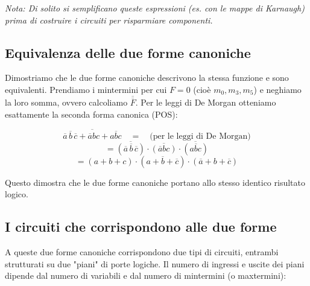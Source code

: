 \documentclass[11pt,a4paper]{report}
\begin{document}
\noindent \emph{Nota: Di solito si semplificano queste espressioni (es. con le mappe di Karnaugh) prima di costruire i circuiti per risparmiare componenti.}

\subsection{Equivalenza delle due forme canoniche}

Dimostriamo che le due forme canoniche descrivono la stessa funzione e sono equivalenti. Prendiamo i mintermini per cui $F=0$ (cioè $m_0, m_3, m_5$) e neghiamo la loro somma, ovvero calcoliamo $\overline{\overline{F}}$. Per le leggi di De Morgan otteniamo esattamente la seconda forma canonica (POS):

\[
\overline{\overline{a}\,\overline{b}\,\overline{c} + \overline{a}bc + a\overline{b}c} \quad = \quad \text{(per le leggi di De Morgan)}
\]
\[
= \overline{(\overline{a}\,\overline{b}\,\overline{c})} \cdot \overline{(\overline{a}bc)} \cdot \overline{(a\overline{b}c)}
\]
\[
= (a+b+c) \cdot (a+\overline{b}+\overline{c}) \cdot (\overline{a}+b+\overline{c})
\]

Questo dimostra che le due forme canoniche portano allo stesso identico risultato logico.

\subsection{I circuiti che corrispondono alle due forme}

A queste due forme canoniche corrispondono due tipi di circuiti, entrambi strutturati su due "piani" di porte logiche. Il numero di ingressi e uscite dei piani dipende dal numero di variabili e dal numero di mintermini (o maxtermini):
\end{document}
